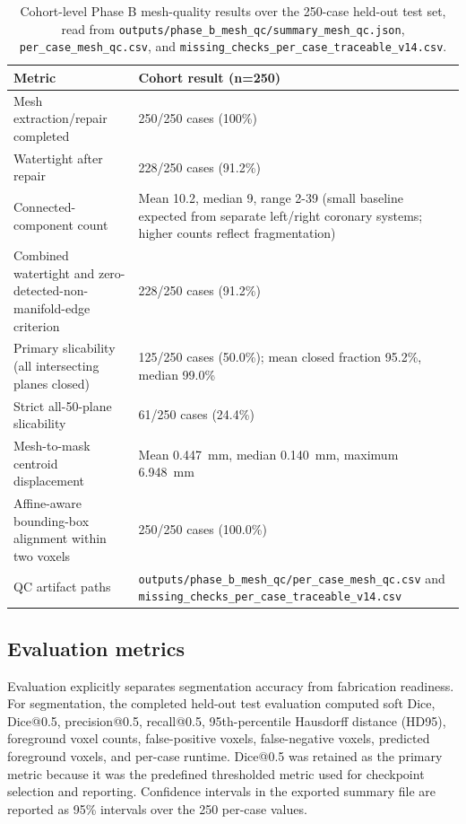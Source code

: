 \documentclass[anonymous]{iopjournal}
\begin{document}
\begin{table}[!htbp]
\centering
\caption{Cohort-level Phase B mesh-quality results over the 250-case held-out test set, read from \texttt{outputs/phase\_b\_mesh\_qc/summary\_mesh\_qc.json}, \texttt{per\_case\_mesh\_qc.csv}, and \texttt{missing\_checks\_per\_case\_traceable\_v14.csv}.}
\label{tab:phaseb-qc}
\begin{threeparttable}
\footnotesize
\begin{tabularx}{0.96\textwidth}{L{0.30\textwidth}Y}
\toprule
\textbf{Metric} & \textbf{Cohort result (n=250)} \\
\midrule
Mesh extraction/repair completed & 250/250 cases (100\%) \\
Watertight after repair & 228/250 cases (91.2\%) \\
Connected-component count & Mean 10.2, median 9, range 2-39 (small baseline expected from separate left/right coronary systems; higher counts reflect fragmentation) \\
Combined watertight and zero-detected-non-manifold-edge criterion & 228/250 cases (91.2\%) \\
Primary slicability (all intersecting planes closed) & 125/250 cases (50.0\%); mean closed fraction 95.2\%, median 99.0\% \\
Strict all-50-plane slicability & 61/250 cases (24.4\%) \\
Mesh-to-mask centroid displacement & Mean \SI{0.447}{mm}, median \SI{0.140}{mm}, maximum \SI{6.948}{mm} \\
Affine-aware bounding-box alignment within two voxels & 250/250 cases (100.0\%) \\
QC artifact paths & \texttt{outputs/phase\_b\_mesh\_qc/per\_case\_mesh\_qc.csv} and \texttt{missing\_checks\_per\_case\_traceable\_v14.csv} \\
\bottomrule
\end{tabularx}
\end{threeparttable}
\end{table}

\subsection{Evaluation metrics}
\label{subsec:metrics}

Evaluation explicitly separates segmentation accuracy from fabrication readiness. For segmentation, the completed held-out test evaluation computed soft Dice, Dice@0.5, precision@0.5, recall@0.5, 95th-percentile Hausdorff distance (HD95), foreground voxel counts, false-positive voxels, false-negative voxels, predicted foreground voxels, and per-case runtime. Dice@0.5 was retained as the primary metric because it was the predefined thresholded metric used for checkpoint selection and reporting. Confidence intervals in the exported summary file are reported as 95\% intervals over the 250 per-case values.
\end{document}
